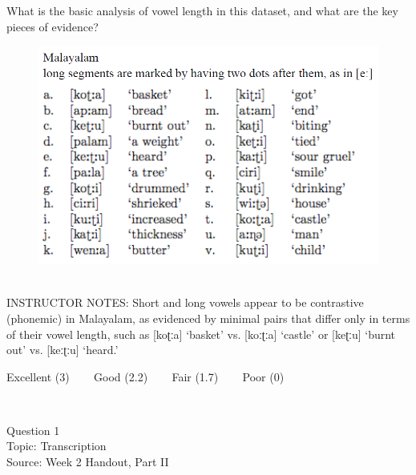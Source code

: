 \documentclass[12pt]{article}
\begin{document}
What is the basic analysis of vowel length in this dataset, and what are the key pieces of evidence?\\

\begin{figure}[H]
\includegraphics{../images/malayalam.png}
\end{figure}

~\\
INSTRUCTOR NOTES: Short and long vowels appear to be contrastive (phonemic) in Malayalam, as evidenced by minimal pairs that differ only in terms of their vowel length, such as [koʈːa] ‘basket’ vs. [koːʈːa] ‘castle’ or [keʈːu] ‘burnt out’ vs. [keːʈːu] ‘heard.’


\vfill
Excellent (3) ~~~ Good (2.2) ~~~ Fair (1.7) ~~~ Poor (0)
\newpage

\begin{center}
\textbf{{\color{red}{\HUGE END OF EXAM}}}\\

\end{center}
\newpage

\begin{center}
\textbf{{\color{blue}{\HUGE START OF EXAM\\}}}

\textbf{{\color{blue}{\HUGE Student ID: 86674\\}}}

\textbf{{\color{blue}{\HUGE \\}}}

\end{center}
\newpage

{\large Question 1}\\

Topic: Transcription\\
Source: Week 2 Handout, Part II\\
\end{document}
